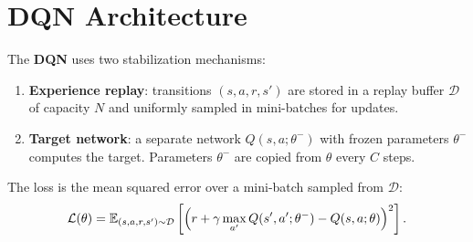 \section{DQN Architecture}
\label{sec:dqn:arch}

\begin{definition}
The \textbf{DQN} uses two stabilization mechanisms:
\begin{enumerate}
    \item \textbf{Experience replay}: transitions
    $(s, a, r, s')$ are stored in a replay buffer $\mathcal{D}$ of capacity
    $N$ and uniformly sampled in mini-batches for updates.
    \item \textbf{Target network}: a separate network
    $Q(s,a;\theta^-)$ with frozen parameters $\theta^-$ computes the target.
    Parameters $\theta^-$ are copied from $\theta$ every $C$ steps.
\end{enumerate}
\end{definition}

\begin{keyformulas}[title=\textbf{DQN Loss Function}]
The loss is the mean squared error over a mini-batch sampled from
$\mathcal{D}$:
\[
    \mathcal{L}(\theta) = \mathbb{E}_{(s,a,r,s') \sim \mathcal{D}} \left[
    \left( r + \gamma \max_{a'} Q(s', a'; \theta^-) - Q(s, a; \theta) \right)^2
    \right].
\]
\end{keyformulas}

